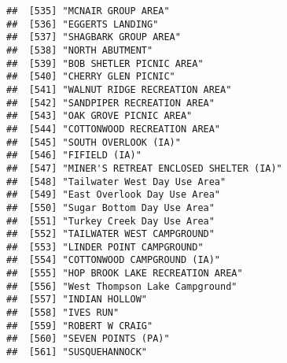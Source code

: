 \documentclass[
]{article}
\begin{document}
\begin{verbatim}
##  [535] "MCNAIR GROUP AREA"                                                                   
##  [536] "EGGERTS LANDING"                                                                     
##  [537] "SHAGBARK GROUP AREA"                                                                 
##  [538] "NORTH ABUTMENT"                                                                      
##  [539] "BOB SHETLER PICNIC AREA"                                                             
##  [540] "CHERRY GLEN PICNIC"                                                                  
##  [541] "WALNUT RIDGE RECREATION AREA"                                                        
##  [542] "SANDPIPER RECREATION AREA"                                                           
##  [543] "OAK GROVE PICNIC AREA"                                                               
##  [544] "COTTONWOOD RECREATION AREA"                                                          
##  [545] "SOUTH OVERLOOK (IA)"                                                                 
##  [546] "FIFIELD (IA)"                                                                        
##  [547] "MINER'S RETREAT ENCLOSED SHELTER (IA)"                                               
##  [548] "Tailwater West Day Use Area"                                                         
##  [549] "East Overlook Day Use Area"                                                          
##  [550] "Sugar Bottom Day Use Area"                                                           
##  [551] "Turkey Creek Day Use Area"                                                           
##  [552] "TAILWATER WEST CAMPGROUND"                                                           
##  [553] "LINDER POINT CAMPGROUND"                                                             
##  [554] "COTTONWOOD CAMPGROUND (IA)"                                                          
##  [555] "HOP BROOK LAKE RECREATION AREA"                                                      
##  [556] "West Thompson Lake Campground"                                                       
##  [557] "INDIAN HOLLOW"                                                                       
##  [558] "IVES RUN"                                                                            
##  [559] "ROBERT W CRAIG"                                                                      
##  [560] "SEVEN POINTS (PA)"                                                                   
##  [561] "SUSQUEHANNOCK"                                                                       

\end{verbatim}
\end{document}
